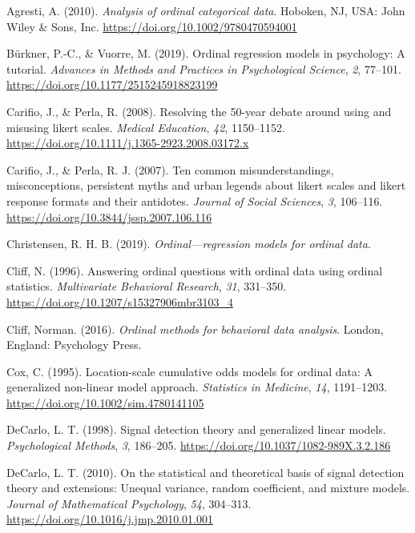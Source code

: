 \documentclass[
  man,floatsintext]{apa6}
\newlength{\cslhangindent}
\newenvironment{CSLReferences}[2] %
 {\begin{list}{}{%
  \setlength{\itemindent}{0pt}
  \setlength{\leftmargin}{0pt}
  \setlength{\parsep}{0pt}
  \ifodd #1
   \setlength{\leftmargin}{\cslhangindent}
   \setlength{\itemindent}{-1\cslhangindent}
  \fi
  \setlength{\itemsep}{#2\baselineskip}}}
 {\end{list}}
\begin{document}
\label{refs}
\begin{CSLReferences}{1}{0}
Agresti, A. (2010). \emph{Analysis of ordinal categorical data}. Hoboken, NJ, USA: John Wiley \& Sons, Inc. \url{https://doi.org/10.1002/9780470594001}

Bürkner, P.-C., \& Vuorre, M. (2019). Ordinal regression models in psychology: A tutorial. \emph{Advances in Methods and Practices in Psychological Science}, \emph{2}, 77--101. \url{https://doi.org/10.1177/2515245918823199}

Carifio, J., \& Perla, R. (2008). Resolving the 50-year debate around using and misusing likert scales. \emph{Medical Education}, \emph{42}, 1150--1152. \url{https://doi.org/10.1111/j.1365-2923.2008.03172.x}

Carifio, J., \& Perla, R. J. (2007). Ten common misunderstandings, misconceptions, persistent myths and urban legends about likert scales and likert response formats and their antidotes. \emph{Journal of Social Sciences}, \emph{3}, 106--116. \url{https://doi.org/10.3844/jssp.2007.106.116}

Christensen, R. H. B. (2019). \emph{Ordinal---regression models for ordinal data}.

Cliff, N. (1996). Answering ordinal questions with ordinal data using ordinal statistics. \emph{Multivariate Behavioral Research}, \emph{31}, 331--350. \url{https://doi.org/10.1207/s15327906mbr3103_4}

Cliff, Norman. (2016). \emph{Ordinal methods for behavioral data analysis}. London, England: Psychology Press.

Cox, C. (1995). Location-scale cumulative odds models for ordinal data: A generalized non-linear model approach. \emph{Statistics in Medicine}, \emph{14}, 1191--1203. \url{https://doi.org/10.1002/sim.4780141105}

DeCarlo, L. T. (1998). Signal detection theory and generalized linear models. \emph{Psychological Methods}, \emph{3}, 186--205. \url{https://doi.org/10.1037/1082-989X.3.2.186}

DeCarlo, L. T. (2010). On the statistical and theoretical basis of signal detection theory and extensions: Unequal variance, random coefficient, and mixture models. \emph{Journal of Mathematical Psychology}, \emph{54}, 304--313. \url{https://doi.org/10.1016/j.jmp.2010.01.001}


\end{CSLReferences}
\end{document}
